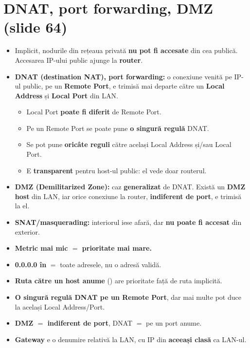 \documentclass[11pt,a4paper]{article}
\begin{document}
\section{DNAT, port forwarding, DMZ (slide 64)}
\begin{itemize}
  \item Implicit, nodurile din rețeaua privată \textbf{nu pot fi accesate} din cea publică. Accesarea IP-ului public ajunge la \textbf{router}.
  \item \textbf{DNAT (destination NAT), port forwarding:} o conexiune venită pe IP-ul public, pe un \textbf{Remote Port}, e trimisă mai departe către un \textbf{Local Address} și \textbf{Local Port} din LAN.
  \begin{itemize}
    \item Local Port \textbf{poate fi diferit} de Remote Port.
    \item Pe un Remote Port se poate pune \textbf{o singură regulă} DNAT.
    \item Se pot pune \textbf{oricâte reguli} către același Local Address și/sau Local Port.
    \item E \textbf{transparent} pentru host-ul public: el vede doar routerul.
  \end{itemize}
  \item \textbf{DMZ (Demilitarized Zone):} caz \textbf{generalizat} de DNAT. Există un \textbf{DMZ host} din LAN, iar orice conexiune la router, \textbf{indiferent de port}, e trimisă la el.
\end{itemize}

\begin{capcana}
\begin{itemize}
  \item \textbf{SNAT/masquerading:} interiorul iese afară, dar \textbf{nu poate fi accesat} din exterior.
  \item \textbf{Metric mai mic $=$ prioritate mai mare.}
  \item \textbf{0.0.0.0 în } $=$ toate adresele, nu o adresă validă.
  \item \textbf{Ruta către un host anume} () are prioritate față de ruta implicită.
  \item \textbf{O singură regulă DNAT pe un Remote Port}, dar mai multe pot duce la același Local Address/Port.
  \item \textbf{DMZ $=$ indiferent de port}, DNAT $=$ pe un port anume.
  \item \textbf{Gateway} e o denumire relativă la LAN, cu IP din \textbf{aceeași clasă} ca LAN-ul.
\end{itemize}
\end{capcana}
\end{document}
